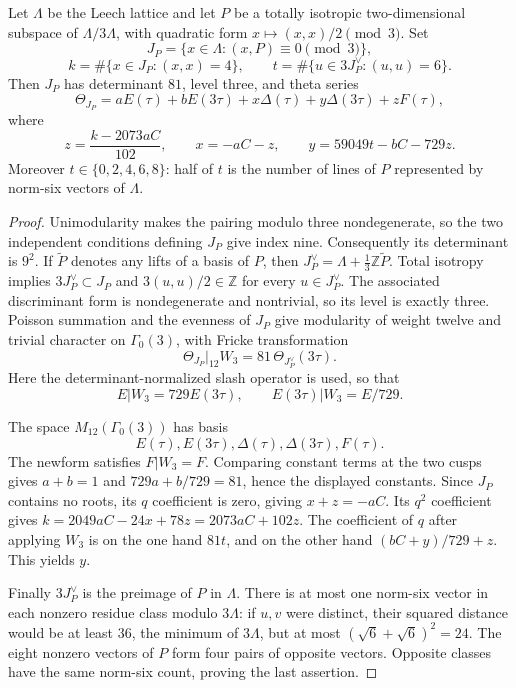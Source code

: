 \begin{theorem}\label{thm:universal-theta-coordinates}
Let $\Lambda$ be the Leech lattice and let $P$ be a totally isotropic
two-dimensional subspace of $\Lambda/3\Lambda$, with quadratic form
$x\mapsto(x,x)/2\pmod3$. Set
\[
 J_P=\{x\in\Lambda:(x,P)\equiv0\pmod3\},
\]\[ 
 k=\#\{x\in J_P:(x,x)=4\},\qquad
 t=\#\{u\in3J_P^\vee:(u,u)=6\}.
\]
Then $J_P$ has determinant $81$, level three, and theta series
\begin{equation}\label{eq:universal-theta}
 \Theta_{J_P}=aE(\tau)+bE(3\tau)
            +x\Delta(\tau)+y\Delta(3\tau)+zF(\tau),
\end{equation}
where
\[
 z=\frac{k-2073aC}{102},\qquad
 x=-aC-z,\qquad
 y=59049t-bC-729z.
\]
Moreover $t\in\{0,2,4,6,8\}$: half of $t$ is the number of
lines of $P$ represented by norm-six vectors of $\Lambda$.
\end{theorem}
\begin{proof}
Unimodularity makes the pairing modulo three nondegenerate, so the
two independent conditions defining $J_P$ give index nine.
Consequently its determinant is $9^2$. If $\widetilde P$ denotes
any lifts of a basis of $P$, then
$J_P^\vee=\Lambda+\tfrac13\mathbb Z\widetilde P$.
Total isotropy implies $3J_P^\vee\subset J_P$ and
$3(u,u)/2\in\mathbb Z$ for every $u\in J_P^\vee$.
The associated discriminant form is nondegenerate and nontrivial,
so its level is exactly three. Poisson summation and the evenness of
$J_P$ give modularity of weight twelve and trivial character on
$\Gamma_0(3)$, with Fricke transformation
\[
 \Theta_{J_P}|_{12}W_3
       =81\,\Theta_{J_P^\vee}(3\tau).
\]
Here the determinant-normalized slash operator is used, so that
\[E|W_3=729E(3\tau),\qquad E(3\tau)|W_3=E/729.\]

The space $M_{12}(\Gamma_0(3))$ has basis
\[E(\tau),E(3\tau),\Delta(\tau),\Delta(3\tau),F(\tau).\]
The newform satisfies $F|W_3=F$. Comparing constant terms at the two
cusps gives $a+b=1$ and $729a+b/729=81$, hence the displayed
constants. Since $J_P$ contains no roots, its $q$ coefficient is
zero, giving $x+z=-aC$. Its $q^2$ coefficient gives
$k=2049aC-24x+78z=2073aC+102z$.
The coefficient of $q$ after applying $W_3$ is on the one hand
$81t$, and on the other hand $(bC+y)/729+z$. This yields $y$.

Finally $3J_P^\vee$ is the preimage of $P$ in $\Lambda$.
There is at most one norm-six vector in each nonzero residue class
modulo $3\Lambda$: if $u,v$ were distinct, their squared distance
would be at least $36$, the minimum of $3\Lambda$, but at most
$(\sqrt6+\sqrt6)^2=24$. The eight nonzero vectors of $P$ form
four pairs of opposite vectors. Opposite classes have the same
norm-six count, proving the last assertion.
\end{proof}

